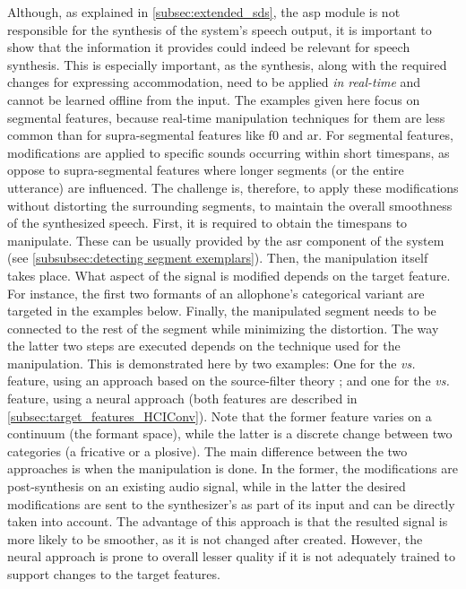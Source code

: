 Although, as explained in \cref{subsec:extended_sds}, the \ac{asp} module is not responsible for the synthesis of the system's speech output, it is important to show that the information it provides could indeed be relevant for speech synthesis.
This is especially important, as the synthesis, along with the required changes for expressing accommodation, need to be applied \emph{in real-time} and cannot be learned offline from the input.
The examples given here focus on segmental features, because real-time manipulation techniques for  them are less common than for supra-segmental features like \ac{f0} and \ac{ar}.
For segmental features, modifications are applied to specific sounds occurring within short timespans, as oppose to supra-segmental features where longer segments (or the entire utterance) are influenced.
The challenge is, therefore, to apply these modifications without distorting the surrounding segments, to maintain the overall smoothness of the synthesized speech.
First, it is required to obtain the timespans to manipulate.
These can be usually provided by the \ac{asr} component of the system (see \cref{subsubsec:detecting segment exemplars}).
Then, the manipulation itself takes place.
What aspect of the signal is modified depends on the target feature.
For instance, the first two formants of an allophone's categorical variant are targeted in the examples below.
Finally, the manipulated segment needs to be connected to the rest of the segment while minimizing the distortion.
The way the latter two steps are executed depends on the technique used for the manipulation.
This is demonstrated here by two examples:
One for the \emph{\textipa{[e]} vs.\ \textipa{[E]}} feature, using an approach based on the source-filter theory \citep{Fant1970acoustic}; and one for the \emph{\textipa{[\c{c}]} vs.\ \textipa{[k]}} feature, using a neural approach (both features are described in \cref{subsec:target_features_HCIConv}).
Note that the former feature varies on a continuum (the formant space), while the latter is a discrete change between two categories (a fricative or a plosive).
The main difference between the two approaches is when the manipulation is done.
In the former, the modifications are post-synthesis on an existing audio signal, while in the latter the desired modifications are sent to the synthesizer's as part of its input and can be directly taken into account.
The advantage of this approach is that the resulted signal is more likely to be smoother, as it is not changed after created.
However, the neural approach is prone to overall lesser quality if it is not adequately trained to support changes to the target features.

